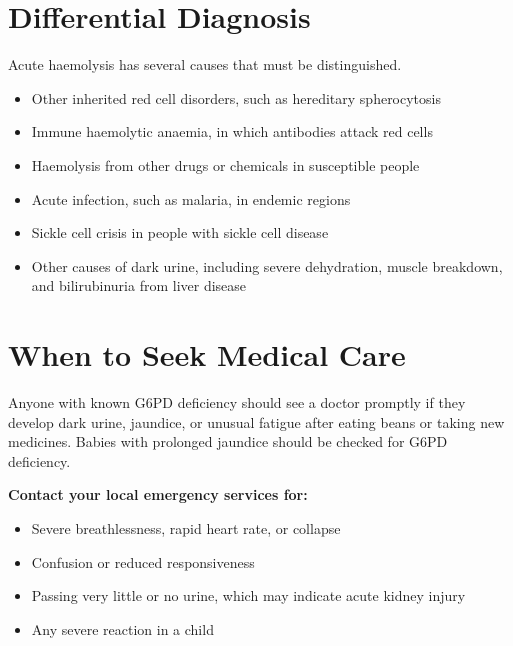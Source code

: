 \section*{Differential Diagnosis}
Acute haemolysis has several causes that must be distinguished.
\begin{itemize}
    \item Other inherited red cell disorders, such as hereditary spherocytosis
    \item Immune haemolytic anaemia, in which antibodies attack red cells
    \item Haemolysis from other drugs or chemicals in susceptible people
    \item Acute infection, such as malaria, in endemic regions
    \item Sickle cell crisis in people with sickle cell disease
    \item Other causes of dark urine, including severe dehydration, muscle breakdown, and bilirubinuria from liver disease
\end{itemize}

\section*{When to Seek Medical Care}
Anyone with known G6PD deficiency should see a doctor promptly if they develop dark urine, jaundice, or unusual fatigue after eating beans or taking new medicines. Babies with prolonged jaundice should be checked for G6PD deficiency.

\textbf{Contact your local emergency services for:}
\begin{itemize}
    \item Severe breathlessness, rapid heart rate, or collapse
    \item Confusion or reduced responsiveness
    \item Passing very little or no urine, which may indicate acute kidney injury
    \item Any severe reaction in a child
\end{itemize}

